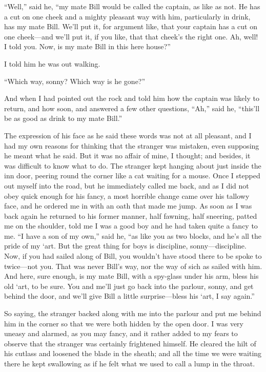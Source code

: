 \enquote{Well,} said he, \enquote{my mate Bill would be called the captain, as like as not. He has a cut on one cheek and a mighty pleasant way with him, particularly in drink, has my mate Bill. We’ll put it, for argument like, that your captain has a cut on one cheek---and we’ll put it, if you like, that that cheek’s the right one. Ah, well! I told you. Now, is my mate Bill in this here house?}

I told him he was out walking.

\enquote{Which way, sonny? Which way is he gone?}

And when I had pointed out the rock and told him how the captain was likely to return, and how soon, and answered a few other questions, \enquote{Ah,} said he, \enquote{this’ll be as good as drink to my mate Bill.}

The expression of his face as he said these words was not at all pleasant, and I had my own reasons for thinking that the stranger was mistaken, even supposing he meant what he said. But it was no affair of mine, I thought; and besides, it was difficult to know what to do. The stranger kept hanging about just inside the inn door, peering round the corner like a cat waiting for a mouse. Once I stepped out myself into the road, but he immediately called me back, and as I did not obey quick enough for his fancy, a most horrible change came over his tallowy face, and he ordered me in with an oath that made me jump. As soon as I was back again he returned to his former manner, half fawning, half sneering, patted me on the shoulder, told me I was a good boy and he had taken quite a fancy to me. \enquote{I have a son of my own,} said he, \enquote{as like you as two blocks, and he’s all the pride of my `art. But the great thing for boys is discipline, sonny---discipline. Now, if you had sailed along of Bill, you wouldn’t have stood there to be spoke to twice---not you. That was never Bill’s way, nor the way of sich as sailed with him. And here, sure enough, is my mate Bill, with a spy-glass under his arm, bless his old `art, to be sure. You and me’ll just go back into the parlour, sonny, and get behind the door, and we’ll give Bill a little surprise---bless his `art, I say again.}

So saying, the stranger backed along with me into the parlour and put me behind him in the corner so that we were both hidden by the open door. I was very uneasy and alarmed, as you may fancy, and it rather added to my fears to observe that the stranger was certainly frightened himself. He cleared the hilt of his cutlass and loosened the blade in the sheath; and all the time we were waiting there he kept swallowing as if he felt what we used to call a lump in the throat.

